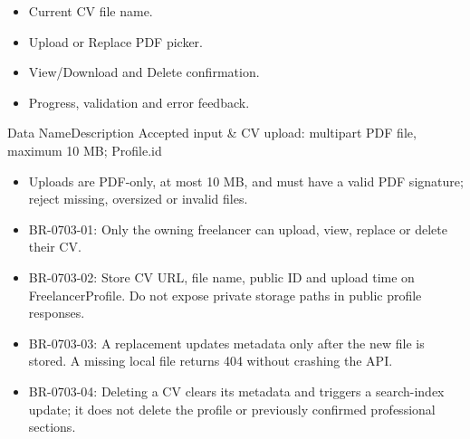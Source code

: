 \begin{itemize}[leftmargin=1.6em,topsep=3pt,itemsep=2pt,parsep=0pt,label=$\bullet$]
    \item Current CV file name.
    \item Upload or Replace PDF picker.
    \item View/Download and Delete confirmation.
    \item Progress, validation and error feedback.
\end{itemize}


\begin{specdatatable}{Data Name}{Description}
Accepted input & CV upload: multipart PDF file, maximum 10 MB; Profile.id\\ \hline
\end{specdatatable}

\begin{itemize}[leftmargin=1.6em,topsep=3pt,itemsep=2pt,parsep=0pt,label=$\bullet$]
    \item Uploads are PDF-only, at most 10 MB, and must have a valid PDF signature; reject missing, oversized or invalid files.
\end{itemize}

\begin{itemize}[leftmargin=1.6em,topsep=3pt,itemsep=2pt,parsep=0pt,label=$\bullet$]\brrulelist
    \item BR-0703-01: Only the owning freelancer can upload, view, replace or delete their CV.
    \item BR-0703-02: Store CV URL, file name, public ID and upload time on FreelancerProfile. Do not expose private storage paths in public profile responses.
    \item BR-0703-03: A replacement updates metadata only after the new file is stored. A missing local file returns 404 without crashing the API.
    \item BR-0703-04: Deleting a CV clears its metadata and triggers a search-index update; it does not delete the profile or previously confirmed professional sections.
\end{itemize}

